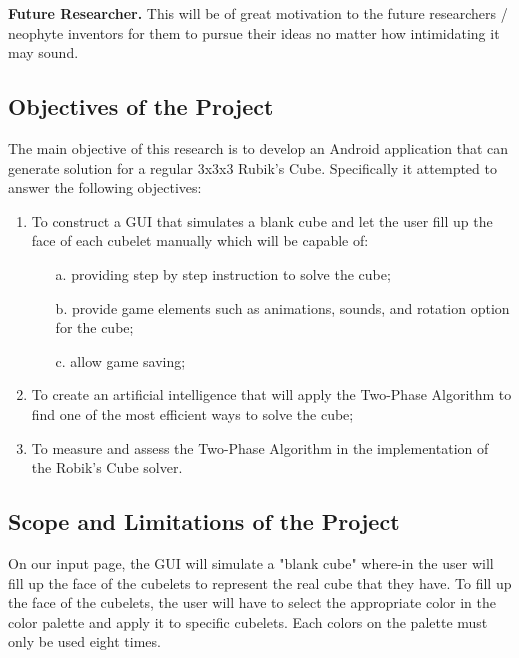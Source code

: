 \textbf{Future Researcher.} This will be of great motivation to the future researchers / neophyte inventors for them to pursue their ideas no matter how intimidating it may sound.

\subsection{Objectives of the Project}
\vspace{-3ex}
The main objective of this research is to develop an Android application that can generate solution for a regular 3x3x3 Rubik's Cube. Specifically it attempted to answer the following objectives:\\
\vspace{-5ex}	
	\begin{enumerate} 
		\item To construct a GUI that simulates a blank cube and let the user fill up the face of each cubelet manually which will be capable of:
		\begin{enumerate}
			\item [a.]providing step by step instruction to solve the cube;
			\item [b.]provide game elements such as animations, sounds, and rotation option for the cube;
			\item [c.]allow game saving;
		\end{enumerate}
		\item To create an artificial intelligence that will apply the Two-Phase Algorithm to find one of the most efficient ways to solve the cube; 
		\item To measure and assess the Two-Phase Algorithm in the implementation of the 
		Robik’s Cube solver.	
	\end{enumerate}

\subsection{Scope and Limitations of the Project}
\vspace{-3ex}
On our input page, the GUI will simulate a "blank cube" where-in the user will fill up the face of the cubelets to represent the real cube that they have. To fill up the face of the cubelets, the user will have to select the appropriate color in the color palette and apply it to specific cubelets. Each colors on the palette must only be used eight times.

